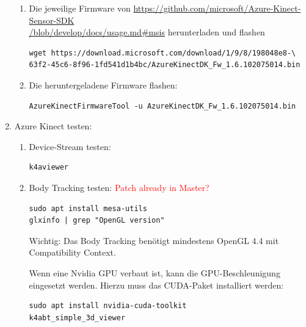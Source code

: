 \begin{enumerate}[label*=\arabic*.]
\begin{enumerate}[label*=\arabic*.]
            \item Die jeweilige Firmware von \href{https://github.com/microsoft/Azure-Kinect-Sensor-SDK/blob/develop/docs/usage.md#msis}{https://github.com/microsoft/Azure-Kinect-Sensor-SDK\\/blob/develop/docs/usage.md\#msis} herunterladen und flashen
                \begin{lstlisting}[style=bash]
wget https://download.microsoft.com/download/1/9/8/198048e8-\
63f2-45c6-8f96-1fd541d1b4bc/AzureKinectDK_Fw_1.6.102075014.bin
                \end{lstlisting}

            \item Die heruntergeladene Firmware flashen:
                \begin{lstlisting}[style=bash]
AzureKinectFirmwareTool -u AzureKinectDK_Fw_1.6.102075014.bin
                \end{lstlisting}
        \end{enumerate}

    \item Azure Kinect testen:
        \begin{enumerate}[label*=\arabic*.]
            \item Device-Stream testen:
                \begin{lstlisting}[style=bash]
k4aviewer
                \end{lstlisting}

            \item Body Tracking testen: \textcolor{red}{Patch already in Master?}
                \begin{lstlisting}[style=bash]
sudo apt install mesa-utils
glxinfo | grep "OpenGL version"
                \end{lstlisting}

                \begin{redbox}{Wichtig:}
                    Das Body Tracking benötigt mindestens OpenGL 4.4 mit Compatibility Context.
                \end{redbox}

                Wenn eine Nvidia GPU verbaut ist, kann die GPU-Beschleunigung eingesetzt werden. Hierzu muss das CUDA-Paket installiert werden:
                \begin{lstlisting}[style=bash]
sudo apt install nvidia-cuda-toolkit
k4abt_simple_3d_viewer
                \end{lstlisting}


\end{enumerate}
\end{enumerate}
